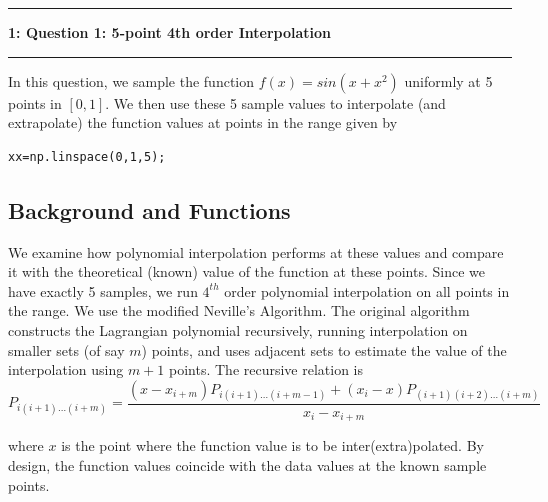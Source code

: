 \documentclass[11pt]{article}
\newcommand\question[2]{\vspace{.25in}\hrule\textbf{#1: #2}\vspace{.5em}\hrule\vspace{.10in}}
\renewcommand\part[1]{\vspace{.10in}\textbf{(#1)}}
\newcommand\algorithm{\vspace{.10in}\textbf{Algorithm: }}
\begin{document}
\raggedright
\newcommand\NAME{Surajkumar H}  %
\newcommand\ANDREWID{EE11B075}     %
\newcommand\HWNUM{1}              %


\question{1}{Question 1: 5-point 4th order Interpolation} 
\setcounter{section}{1}

In this question, we sample the function $f(x)=sin(x+x^2)$ uniformly at 5 points in $[0,1]$. We then use these 5 sample values to interpolate (and extrapolate) the function values at points in the range given by 
\begin{lstlisting}
xx=np.linspace(0,1,5);
\end{lstlisting}

\subsection{Background and Functions}

We examine how polynomial interpolation performs at these values and compare it with the theoretical (known) value of the function at these points. Since we have exactly 5 samples, we run $4^{th}$ order polynomial interpolation on all points in the range. We use the modified Neville's Algorithm. The original algorithm constructs the Lagrangian polynomial recursively, running interpolation on smaller sets (of say $m$) points, and uses adjacent sets to estimate the value of the interpolation using $m+1$ points. The recursive relation is
\begin{equation}
P_{i(i+1)\ldots(i+m)} = \frac{(x-x_{i+m})P_{i(i+1)\ldots(i+m-1)}+(x_{i}-x)P_{(i+1)(i+2)\ldots(i+m)}}{x_i - x_{i+m}}
\end{equation}

where $x$ is the point where the function value is to be inter(extra)polated. By design, the function values coincide with the data values at the known sample points.  
\end{document}

